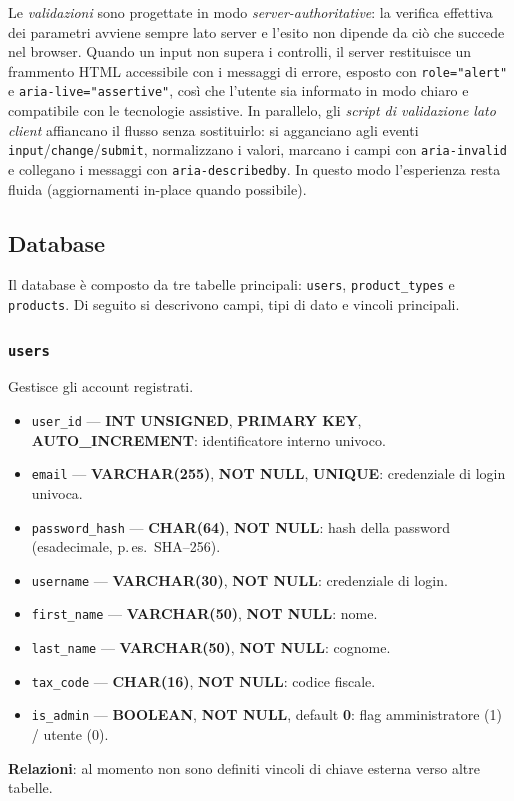 Le \emph{validazioni} sono progettate in modo \emph{server-authoritative}: la verifica effettiva dei parametri avviene sempre lato server e l’esito non dipende da ciò che succede nel browser. Quando un input non supera i controlli, il server restituisce un frammento HTML accessibile con i messaggi di errore, esposto con \texttt{role="alert"} e \texttt{aria-live="assertive"}, così che l’utente sia informato in modo chiaro e compatibile con le tecnologie assistive. In parallelo, gli \emph{script di validazione lato client} affiancano il flusso senza sostituirlo: si agganciano agli eventi \texttt{input}/\texttt{change}/\texttt{submit}, normalizzano i valori, marcano i campi con \texttt{aria-invalid} e collegano i messaggi con \texttt{aria-describedby}. In questo modo l’esperienza resta fluida (aggiornamenti in-place quando possibile).

\subsection{Database}

Il database è composto da tre tabelle principali: \texttt{users}, \texttt{product\_types} e \texttt{products}. 
Di seguito si descrivono campi, tipi di dato e vincoli principali.

\subsubsection{\texttt{users}}
Gestisce gli account registrati.
\begin{itemize}[leftmargin=2.2em]
  \item \texttt{user\_id} — \textbf{INT UNSIGNED}, \textbf{PRIMARY KEY}, \textbf{AUTO\_INCREMENT}: identificatore interno univoco.
  \item \texttt{email} — \textbf{VARCHAR(255)}, \textbf{NOT NULL}, \textbf{UNIQUE}: credenziale di login univoca.
  \item \texttt{password\_hash} — \textbf{CHAR(64)}, \textbf{NOT NULL}: hash della password (esadecimale, p.\,es.\ SHA--256).
   \item \texttt{username} — \textbf{VARCHAR(30)}, \textbf{NOT NULL}: credenziale di login.
  \item \texttt{first\_name} — \textbf{VARCHAR(50)}, \textbf{NOT NULL}: nome.
  \item \texttt{last\_name} — \textbf{VARCHAR(50)}, \textbf{NOT NULL}: cognome.
  \item \texttt{tax\_code} — \textbf{CHAR(16)}, \textbf{NOT NULL}: codice fiscale.
  \item \texttt{is\_admin} — \textbf{BOOLEAN}, \textbf{NOT NULL}, default \textbf{0}: flag amministratore (1) / utente (0).
\end{itemize}
\textbf{Relazioni}: al momento non sono definiti vincoli di chiave esterna verso altre tabelle.

